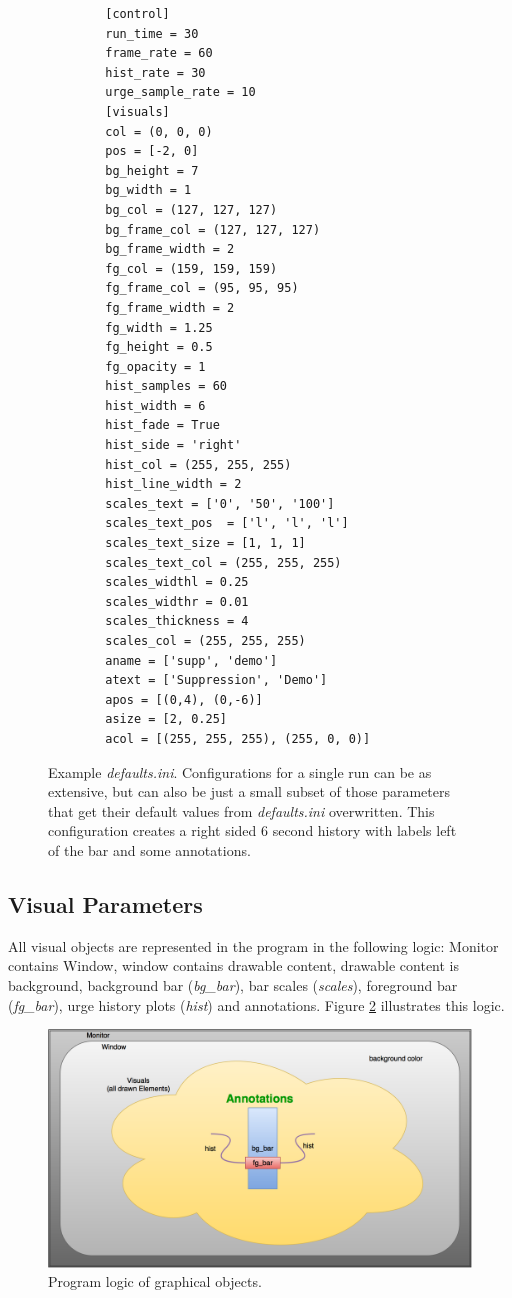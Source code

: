 \documentclass[12pt,a4paper]{book}
\begin{document}
\begin{figure}
	\begin{framed}
		\begin{verbatim}
		[control]
		run_time = 30
		frame_rate = 60
		hist_rate = 30
		urge_sample_rate = 10
		[visuals]
		col = (0, 0, 0)
		pos = [-2, 0]
		bg_height = 7
		bg_width = 1
		bg_col = (127, 127, 127)
		bg_frame_col = (127, 127, 127)
		bg_frame_width = 2
		fg_col = (159, 159, 159)
		fg_frame_col = (95, 95, 95)
		fg_frame_width = 2
		fg_width = 1.25
		fg_height = 0.5
		fg_opacity = 1
		hist_samples = 60
		hist_width = 6
		hist_fade = True
		hist_side = 'right'
		hist_col = (255, 255, 255)
		hist_line_width = 2
		scales_text = ['0', '50', '100']
		scales_text_pos  = ['l', 'l', 'l']
		scales_text_size = [1, 1, 1]
		scales_text_col = (255, 255, 255)
		scales_widthl = 0.25
		scales_widthr = 0.01
		scales_thickness = 4
		scales_col = (255, 255, 255)
		aname = ['supp', 'demo']
		atext = ['Suppression', 'Demo']
		apos = [(0,4), (0,-6)]
		asize = [2, 0.25]
		acol = [(255, 255, 255), (255, 0, 0)]
		\end{verbatim}
	\end{framed}
	\caption{Example \textit{defaults.ini}. Configurations for a single run can be as extensive, but can also be just a small subset of those parameters that get their default values from \textit{defaults.ini} overwritten. This configuration creates a right sided 6 second history with labels left of the bar and some annotations.}
	\label{fig:defaultsini}
\end{figure}

\subsection{Visual Parameters}\label{ssec:visuals}

All visual objects are represented in the program in the following logic: Monitor contains Window, window contains drawable content, drawable content is background, background bar (\emph{bg\_bar}), bar scales (\emph{scales}), foreground bar (\emph{fg\_bar}), urge history plots (\emph{hist}) and annotations. Figure \ref{fig:graph_log} illustrates this logic.

\begin{figure}
\includegraphics[width = \linewidth]{ressources/urge_graph}
\caption{Program logic of graphical objects.}
\label{fig:graph_log}
\end{figure}
\end{document}
